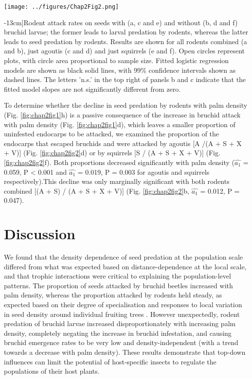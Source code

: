 \documentclass[b5paper,justified]{tufte-book} %
\begin{document}
\begin{fullwidth}
\begin{landscape}
 \begin{figure*}
\hspace*{5cm} \texttt{[image: ../figures/Chap2Fig2.png]}
\caption[Rodent attack rates][-13cm]{Rodent attack rates on seeds with (a, c and e) and without (b, d and f) bruchid larvae; the former leads to larval predation by rodents, whereas the latter leads to seed predation by rodents. Results are shown for all rodents combined (a and b), just agoutis (c and d) and just squirrels (e and f). Open circles represent plots, with circle area proportional to sample size. Fitted logistic regression models are shown as black solid lines, with 99\% confidence intervals shown as dashed lines. The letters 'n.s.' in the top right of panels b and c indicate that the fitted model slopes are not significantly different from zero.
 }
\label{fig:chap2fig2}
\end{figure*}
\end{landscape}

To determine whether the decline in seed predation by rodents with palm density (Fig. \ref{fig:chap2fig1}h) is a passive consequence of the increase in bruchid attack with palm density (Fig. \ref{fig:chap2fig1}d), which leaves a smaller proportion of uninfested endocarps to be attacked, we examined the proportion of the endocarps that escaped bruchids and were attacked by agoutis [A /(A + S + X + V)] (Fig. \ref{fig:chap2fig2}d) or by squirrels [S / (A + S + X + V)] (Fig. \ref{fig:chap2fig2}f). Both proportions decreased significantly with palm density ($\hat{a_1} $ = 0.059, P < 0.001 and $\hat{a_1} $ = 0.019, P = 0.003 for agoutis and squirrels respectively).This decline was only marginally significant with both rodents combined [(A + S) / (A + S + X + V)] (Fig. \ref{fig:chap2fig2}b, $\hat{a_1} $ = 0.012, P = 0.047).

\section{Discussion}
We found that the density dependence of seed predation at the population scale differed from what was expected based on distance-dependence at the local scale, and that trophic interactions were critical to explaining the population-level patterns. The proportion of seeds attacked by bruchid beetles increased with palm density, whereas the proportion attacked by rodents held steady, as expected based on their degree of specialisation and responses to local variation in seed density around individual fruiting trees \citep{Hammond1998}. However unexpectedly, rodent predation of bruchid larvae increased disproportionately with increasing palm density, completely negating the increase in bruchid infestation, and causing bruchid emergence rates to be very low and density-independent (with a trend towards a decrease with palm density). These results demonstrate that top-down influences can limit the potential of host-specific insects to regulate the populations of their host plants.


\end{fullwidth}
\end{document}
